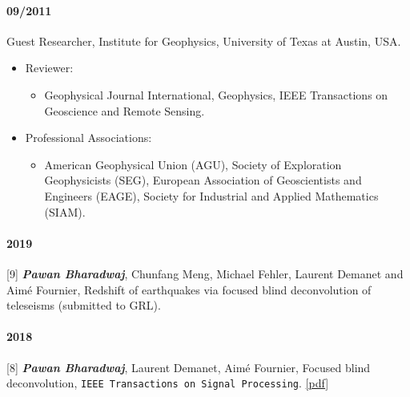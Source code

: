 \documentclass[9pt]{developercv} %
\def\tightlist{}
\providecommand{\tightlist}{%
  \setlength{\itemsep}{0pt}\setlength{\parskip}{0pt}}
\begin{document}
\paragraph{09/2011}\label{section-17}

Guest
Researcher,
Institute
for
Geophysics,
University
of Texas
at Austin,
USA.

\label{service}

\begin{itemize}
\tightlist
\item
  Reviewer:

  \begin{itemize}
  \tightlist
  \item
    Geophysical
    Journal
    International,
    Geophysics,
    IEEE
    Transactions
    on
    Geoscience
    and
    Remote
    Sensing.
  \end{itemize}
\item
  Professional
  Associations:

  \begin{itemize}
  \tightlist
  \item
    American
    Geophysical
    Union
    (AGU),
    Society
    of
    Exploration
    Geophysicists
    (SEG),
    European
    Association
    of
    Geoscientists
    and
    Engineers
    (EAGE),
    Society
    for
    Industrial
    and
    Applied
    Mathematics
    (SIAM).
  \end{itemize}
\end{itemize}

\label{peer-reviewed-journal-articles}

\paragraph{2019}\label{section-18}

{[}9{]}
\textbf{\emph{Pawan
Bharadwaj}},
Chunfang
Meng,
Michael
Fehler,
Laurent
Demanet
and Aimé
Fournier,
Redshift
of
earthquakes
via
focused
blind
deconvolution
of
teleseisms
(submitted
to GRL).

\paragraph{2018}\label{section-19}

{[}8{]}
\textbf{\emph{Pawan
Bharadwaj}},
Laurent
Demanet,
Aimé
Fournier,
Focused
blind
deconvolution,
\texttt{IEEE\ Transactions\ on\ Signal\ Processing}.
\href{https://github.com/pawbz/pawbz.github.io/blob/src/pdf/papers/Bharadwaj_FBD_arXiv1.pdf}{{[}pdf{]}}
\end{document}
